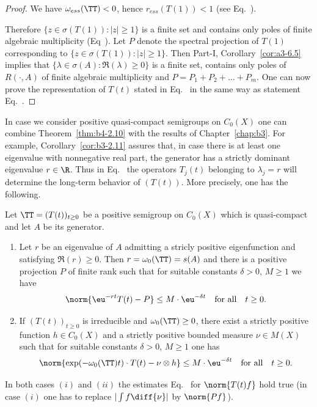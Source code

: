 \begin{proof} We have $\omega_{ess}(\TT) < 0$, hence $r_{ess}(T(1)) < 1$ (see  Eq.~).

Therefore $\{z \in \sigma(T(1)) \colon |z| \geq 1\}$ is a finite set and contains only poles of finite algebraic multiplicity 
(\cf Eq~). 
Let $P$ denote the spectral projection of\/ $T(1)$ corresponding to $\{z \in \sigma(T(1))\colon |z| \geq 1\}$. 
Then Part-I, Corollary~\ref{cor:a3-6.5} implies that $\{\lambda \in \sigma(A) \colon \Re(\lambda) \geq 0\}$ is a finite set, contains only poles of\/ $R(\cdot,A)$ of finite algebraic multiplicity and $P = P_1+P_2+ \ldots +P_m$. 
One can now prove the representation of\/ $T(t)$ stated in Eq.~ in the same way as statement Eq.~.
\end{proof}
In case we consider positive quasi-compact semigroups on $C_{0}(X)$ one can combine Theorem~\ref{thm:b4-2.10} with the results of Chapter~\ref{chap:b3}. 
For example, Corollary~\ref{cor:b3-2.11} assures that, in case there is at least one eigenvalue with nonnegative real part, the generator has a strictly dominant eigenvalue $r \in \R$. 
Thus in Eq.~ the operators $T_j(t)$ belonging to $\lambda_j = r$ will determine the long-term behavior of\/ $(T(t))$. More precisely, one has the following.
\begin{corollary}\label{cor:b4-2.11}%
%
Let $\TT = (T(t))_{t \geq 0}$ be a positive semigroup on $C_{0}(X)$ which is quasi-compact and let $A$ be its generator.
\begin{enumerate}[\upshape (i)]
	\item	
	Let $r$ be an eigenvalue of\/ $A$ admitting a stricly positive eigenfunction and satisfying $\Re(r) \geq 0$. 
    Then $r = \omega_{0}(\TT) = s(A)$ and there is a positive projection $P$ of finite rank such that for suitable constants $\delta > 0$, $M \geq 1$ we have
	\begin{equation}\label{eq:b4-2.6}
		\norm{\eu^{-rt}T(t) - P} \leq M \cdot \eu^{-\delta t} \quad \text{for all} \quad t \geq 0 \text{.}
	\end{equation}
	
	\item 
	If\/ $(T(t))_{t \geq 0}$ is irreducible and $\omega_{0}(\TT) \geq 0$, there exist a strictly positive function $h \in C_{0}(X)$ and a strictly positive bounded measure $\nu \in M(X)$ such that for suitable constants $\delta > 0$, $M \geq 1$ one has
	\begin{equation}\label{eq:b4-2.7}
		\norm{\exp(-\omega_{0}(\TT)t) \cdot T(t) - \nu \otimes h} \leq M \cdot \eu^{-\delta t} \quad \text{for all} \quad t \geq 0 \text{.}
	\end{equation}
\end{enumerate}
In both cases $(i)$ and $(ii)$ the estimates Eq.~ for $\norm{T(t)f}$ hold true (in case $(i)$ one has to replace $|\int f \diff{\nu}|$ by $\norm{Pf}$).
\end{corollary}
